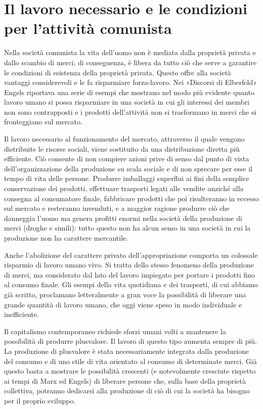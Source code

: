 \documentclass[../main]{subfiles}
\begin{document}
\ifSubfilesClassLoaded{\setcounter{page}{36}}{}
\section{Il lavoro necessario e le condizioni per l'attività comunista}
\label{sec:06_opera_necessaria}

Nella società comunista la vita dell'uomo non è mediata dalla proprietà privata e dallo scambio di merci; di conseguenza, è libera da tutto ciò che serve a garantire le condizioni di esistenza della proprietà privata. Questo offre alla società vantaggi considerevoli e le fa risparmiare forza-lavoro. Nei «Discorsi di Elberfeld» Engels riportava una serie di esempi che mostrano nel modo più evidente quanto lavoro umano si possa risparmiare in una società in cui gli interessi dei membri non sono contrapposti e i prodotti dell'attività non si trasformano in merci che si fronteggiano sul mercato.

Il lavoro necessario al funzionamento del mercato, attraverso il quale vengono distribuite le risorse sociali, viene sostituito da una distribuzione diretta più efficiente. Ciò consente di non compiere azioni prive di senso dal punto di vista dell'organizzazione della produzione su scala sociale e di non sprecare per esse il tempo di vita delle persone. Produrre imballaggi superflui ai fini della semplice conservazione dei prodotti, effettuare trasporti legati alle vendite anziché alla consegna al consumatore finale, fabbricare prodotti che poi risulteranno in eccesso sul mercato e resteranno invenduti, e a maggior ragione produrre ciò che danneggia l'uomo ma genera profitti enormi nella società della produzione di merci (droghe e simili): tutto questo non ha alcun senso in una società in cui la produzione non ha carattere mercantile.

Anche l'abolizione del carattere privato dell'appropriazione comporta un colossale risparmio di lavoro umano vivo. Si tratta dello stesso fenomeno della produzione di merci, ma considerato dal lato del lavoro impiegato per portare i prodotti fino al consumo finale. Gli esempi della vita quotidiana e dei trasporti, di cui abbiamo già scritto, proclamano letteralmente a gran voce la possibilità di liberare una grande quantità di lavoro umano, che oggi viene speso in modo individuale e inefficiente.

Il capitalismo contemporaneo richiede sforzi umani volti a mantenere la possibilità di produrre plusvalore. Il lavoro di questo tipo aumenta sempre di più. La produzione di plusvalore è stata necessariamente integrata dalla produzione del consumo e di uno stile di vita orientato al consumo di determinate merci. Già questo basta a mostrare le possibilità crescenti (e notevolmente cresciute rispetto ai tempi di Marx ed Engels) di liberare persone che, sulla base della proprietà collettiva, potranno dedicarsi alla produzione di ciò di cui la società ha bisogno per il proprio sviluppo.
\end{document}
